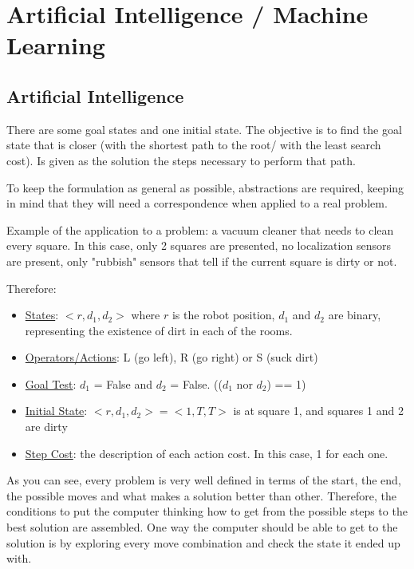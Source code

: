 
\section{Artificial Intelligence / Machine Learning}

\subsection{Artificial Intelligence}
There are some goal states and one initial state. The objective is to find the goal state that is closer (with the shortest path to the root/ with the least search cost). Is given as the solution the steps necessary to perform that path.

To keep the formulation as general as possible, abstractions are required, keeping in mind that they will need a correspondence when applied to a real problem.

Example of the application to a problem: a vacuum cleaner that needs to clean every square. In this case, only 2 squares are presented, no localization sensors are present, only "rubbish" sensors that tell if the current square is dirty or not.

Therefore:
\begin{itemize}
    \item \ul{States}: $<r, d_1, d_2>$ where $r$ is the robot position, $d_1$ and $d_2$ are binary, representing the existence of dirt in each of the rooms.
    \item \ul{Operators/Actions}: L (go left), R (go right) or S (suck dirt)
    \item \ul{Goal Test}: $d_1$ = False and $d_2$ = False. (($d_1$ nor $d_2$) == 1)
    \item \ul{Initial State}: $<r, d_1, d_2> = <1, T, T>$ is at square 1, and squares 1 and 2 are dirty
    \item \ul{Step Cost}: the description of each action cost. In this case, 1 for each one.
\end{itemize}








As you can see, every problem is very well defined in terms of the start, the end, the possible moves and what makes a solution better than other. Therefore, the conditions to put the computer thinking how to get from the possible steps to the best solution are assembled. One way the computer should be able to get to the solution is by exploring every move combination and check the state it ended up with.


